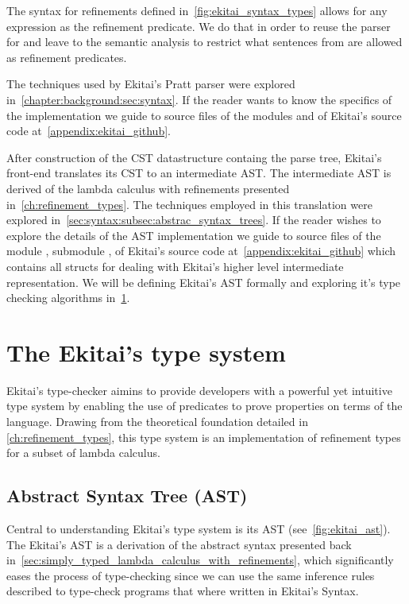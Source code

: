 \documentclass[
  oneside,
  english,
  coorientadorbanca,
  noabntexcite
]{ufsc-thesis-rn46-2019}
\newcommand{\codett}[1]{\text{\scpfamily#1}}
\newcommand{\code}[1]{\text{\scpfamily\setlength\spaceskip{0.35em}#1}}
\newcommand{\bnfvar}[1]{\codett{#1}}
\begin{document}
The syntax for refinements defined in~\cref{fig:ekitai_syntax_types} allows for any expression as the refinement predicate.
We do that in order to reuse the parser for \bnfvar{Expr} and leave to the semantic analysis to restrict what sentences from \bnfvar{Expr} are allowed as refinement predicates.

The techniques used by Ekitai's Pratt parser were explored in~\cref{chapter:background:sec:syntax}.
If the reader wants to know the specifics of the implementation we guide to source files of the modules \code{syntax} and \code{parser} of Ekitai's source code at~\cref{appendix:ekitai_github}.

After construction of the CST datastructure containg the parse tree, Ekitai's front-end translates its CST to an intermediate AST.
The intermediate AST is derived of the lambda calculus with refinements presented in~\cref{ch:refinement_types}.
The techniques employed in this translation were explored in~\cref{sec:syntax:subsec:abstrac_syntax_trees}.
If the reader wishes to explore the details of the AST implementation we guide to source files of the module \code{hir}, submodule \code{semantic\_ir}, of Ekitai's source code at~\cref{appendix:ekitai_github} which contains all structs for dealing with Ekitai's higher level intermediate representation.
We will be defining Ekitai's AST formally and exploring it's type checking algorithms in~\cref{sec:ekitai_type_system}.

\section{The Ekitai's type system}\label{sec:ekitai_type_system}

Ekitai's type-checker aimins to provide developers with a powerful yet intuitive type system by enabling the use of predicates to prove properties on terms of the language.
Drawing from the theoretical foundation detailed in \cref{ch:refinement_types}, this type system is an implementation of refinement types for a subset of lambda calculus.

\subsection{Abstract Syntax Tree (AST)}

Central to understanding Ekitai's type system is its AST (see~\cref{fig:ekitai_ast}).
The Ekitai's AST is a derivation of the abstract syntax presented back in~\cref{sec:simply_typed_lambda_calculus_with_refinements}, which significantly eases the process of type-checking since we can use the same inference rules described to type-check programs that where written in Ekitai's Syntax.
\end{document}
